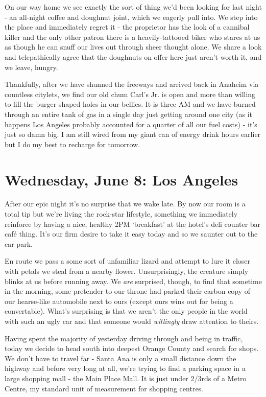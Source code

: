 \documentclass[a5paper,titlepage,11pt]{book}
\begin{document}
On our way home we see exactly the sort of thing we'd been looking for last night - an all-night coffee and doughnut joint, which we eagerly pull into.  We step into the place and immediately regret it - the proprietor has the look of a cannibal killer and the only other patron there is a heavily-tattooed biker who stares at us as though he can snuff our lives out through sheer thought alone.  We share a look and telepathically agree that the doughnuts on offer here just aren't worth it, and we leave, hungry.

Thankfully, after we have shunned the freeways and arrived back in Anaheim via countless citylets, we find our old chum Carl's Jr. is open and more than willing to fill the burger-shaped holes in our bellies.  It is three AM and we have burned through an entire tank of gas in a single day just getting around one city (as it happens Los Angeles probably accounted for a quarter of all our fuel costs) - it's just so damn big.  I am still wired from my giant can of energy drink hours earlier but I do my best to recharge for tomorrow.

\chapter[Los Angeles]{Wednesday, June 8: Los Angeles}
After our epic night it's no surprise that we wake late.  By now our room is a total tip but we're living the rock-star lifestyle, something we immediately reinforce by having a nice, healthy 2PM `breakfast' at the hotel's deli counter bar caf\'{e} thing.  It's our firm desire to take it easy today and so we saunter out to the car park.

En route we pass a some sort of unfamiliar lizard and attempt to lure it closer with petals we steal from a nearby flower.  Unsurprisingly, the creature simply blinks at us before running away.  We \emph{are} surprised, though, to find that sometime in the morning, some pretender to our throne had parked their carbon-copy of our hearse-like automobile next to ours (except ours wins out for being a convertable).  What's surprising is that we aren't the only people in the world with such an ugly car and that someone would \emph{willingly} draw attention to theirs.

Having spent the majority of yesterday driving through and being in traffic, today we decide to head south into deepest Orange County and search for shops.  We don't have to travel far - Santa Ana is only a small distance down the highway and before very long at all, we're trying to find a parking space in a large shopping mall - the Main Place Mall.  It is just under 2/3rds of a Metro Centre, my standard unit of measurement for shopping centres.
\end{document}
